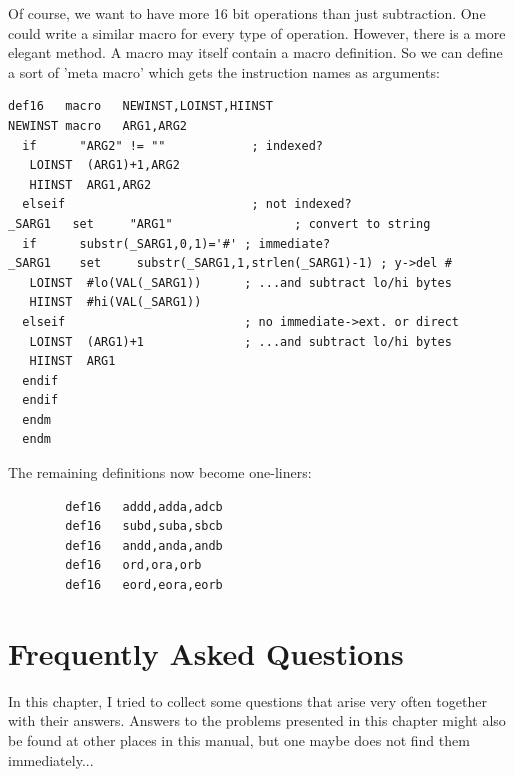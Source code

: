 \documentclass[12pt,twoside]{report}
\begin{document}
Of course, we want to have more 16 bit operations than just subtraction.  One
could write a similar macro for every type of operation. However, there is a
more elegant method.  A macro may itself contain a macro definition.  So we
can define a sort of 'meta macro' which gets the instruction names as arguments:
\begin{verbatim}
def16   macro   NEWINST,LOINST,HIINST
NEWINST macro   ARG1,ARG2
  if      "ARG2" != ""            ; indexed?
   LOINST  (ARG1)+1,ARG2
   HIINST  ARG1,ARG2
  elseif                          ; not indexed?
_SARG1   set     "ARG1"                 ; convert to string
  if      substr(_SARG1,0,1)='#' ; immediate?
_SARG1    set     substr(_SARG1,1,strlen(_SARG1)-1) ; y->del #
   LOINST  #lo(VAL(_SARG1))      ; ...and subtract lo/hi bytes
   HIINST  #hi(VAL(_SARG1))
  elseif                         ; no immediate->ext. or direct
   LOINST  (ARG1)+1              ; ...and subtract lo/hi bytes
   HIINST  ARG1
  endif
  endif
  endm
  endm
\end{verbatim}
The remaining definitions now become one-liners:
\begin{verbatim}
        def16   addd,adda,adcb
        def16   subd,suba,sbcb
        def16   andd,anda,andb
        def16   ord,ora,orb
        def16   eord,eora,eorb
\end{verbatim}



\cleardoublepage
\chapter{Frequently Asked Questions}

In this chapter, I tried to collect some questions that arise very often
together with their answers.  Answers to the problems presented in
this chapter might also be found at other places in this manual, but
one maybe does not find them immediately...
\end{document}
